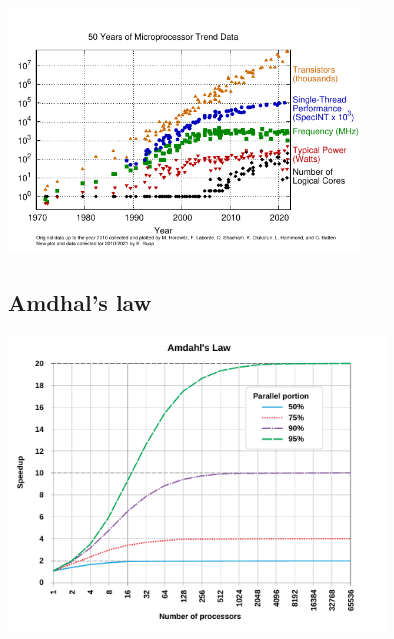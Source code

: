 \endgroup
\begingroup
\nologo
\begin{frame}{}
    \centering
    \includegraphics[width=0.7\textwidth]{pics/introduction/50-years-processor-trend.pdf}
\end{frame}
\subsection{Amdhal's law}
\begin{frame}{}
    \centering
    \includegraphics[width=0.75\textwidth]{pics/introduction/AmdahlsLaw.pdf}
\end{frame}
\endgroup
